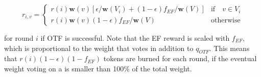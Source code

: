 \begin{equation}
  r_{i,v} = \begin{cases} r(i)\boldsymbol{w}(v)[\epsilon/\boldsymbol{w}(V_i) + (1-\epsilon)f_{EF}/\boldsymbol{w}(V)] &\text{if}\quad v\in V_i\\
    r(i)\boldsymbol{w}(v)(1-\epsilon)f_{EF}/\boldsymbol{w}(V) & \text{otherwise}
  \end{cases}
\end{equation}

for round $i$ if OTF is successful. Note that the EF reward is scaled with $f_{EF}$, which is proportional to the weight that votes in addition to $q_{OTF}$. This means that $r(i)(1-\epsilon)(1-f_{EF})$ tokens are burned for each round, if the eventual weight voting on a \PROP is smaller than 100\% of the total weight.







